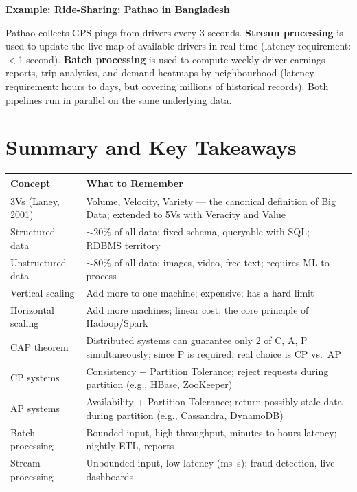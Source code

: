 \documentclass[12pt,a4paper]{article}
\newcommand{\examplebox}[2]{%
  \noindent
  \colorbox{PUTeal!10}{%
    \begin{minipage}{\dimexpr\linewidth-2\fboxsep}
      \vspace{4pt}
      \textbf{\textcolor{PUTeal}{Example: #1}}\par\vspace{2pt}
      #2
      \vspace{4pt}
    \end{minipage}%
  }\par\vspace{6pt}%
}
\begin{document}
\examplebox{Ride-Sharing: Pathao in Bangladesh}{Pathao collects GPS pings from drivers every 3 seconds. \textbf{Stream processing} is used to update the live map of available drivers in real time (latency requirement: $<$1 second). \textbf{Batch processing} is used to compute weekly driver earnings reports, trip analytics, and demand heatmaps by neighbourhood (latency requirement: hours to days, but covering millions of historical records). Both pipelines run in parallel on the same underlying data.}

\section{Summary and Key Takeaways}

\begin{center}
\renewcommand{\arraystretch}{1.5}
\begin{tabular}{p{4.0cm}p{9.0cm}}
  \toprule
  \textbf{Concept} & \textbf{What to Remember} \\
  \midrule
  3Vs (Laney, 2001) & Volume, Velocity, Variety — the canonical definition of Big Data; extended to 5Vs with Veracity and Value \\
  Structured data & $\sim$20\% of all data; fixed schema, queryable with SQL; RDBMS territory \\
  Unstructured data & $\sim$80\% of all data; images, video, free text; requires ML to process \\
  Vertical scaling & Add more to one machine; expensive; has a hard limit \\
  Horizontal scaling & Add more machines; linear cost; the core principle of Hadoop/Spark \\
  CAP theorem & Distributed systems can guarantee only 2 of C, A, P simultaneously; since P is required, real choice is CP vs.\ AP \\
  CP systems & Consistency + Partition Tolerance; reject requests during partition (e.g., HBase, ZooKeeper) \\
  AP systems & Availability + Partition Tolerance; return possibly stale data during partition (e.g., Cassandra, DynamoDB) \\
  Batch processing & Bounded input, high throughput, minutes-to-hours latency; nightly ETL, reports \\
  Stream processing & Unbounded input, low latency (ms--s); fraud detection, live dashboards \\
  \bottomrule
\end{tabular}
\end{center}
\end{document}
